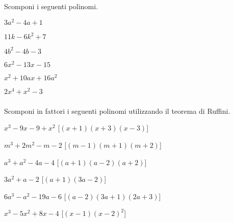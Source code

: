 \begin{esercizio}
 \label{ese:17.10}
 Scomponi i seguenti polinomi.
\begin{multicols}{3}
 \begin{enumeratea}
 \item $3a^{{2}}-4a+1$
 \item $11k-6k^{2}+7$
 \item $4b^{{2}}-4b-3$
 \item $6x^{2}-13x-15$
 \item $x^{2}+10ax+16a^{2}$
 \item $2x^{{4}}+x^{{2}}-3$
 \end{enumeratea}
\end{multicols}
 \end{esercizio}

\subsubsection*{}

\begin{esercizio}[\Ast]
\label{ese:17.13}
Scomponi in fattori i seguenti polinomi utilizzando il teorema di Ruffini.
 \begin{enumeratea}
 \item $x^{3}-9x-9+x^{2}$
  \hfill [$(x+1)(x+3)\left(x-3\right)$]
\item $m^{3}+2m^{2}-m-2$
  \hfill [$(m-1)(m+1)\left(m+2\right)$]
\item $a^{3}+a^{2}-4a-4$
  \hfill [$(a+1)(a-2)\left(a+2\right)$]
\item $3a^{2}+a-2$
  \hfill [$(a+1)\left(3a-2\right)$]
\item $6a^{3}-a^{2}-19a-6$
  \hfill [$(a-2)(3a+1)\left(2a+3\right)$]
\item $x^{3}-5x^{2}+8x-4$
  \hfill [$(x-1)(x-2)^{2}$]
 \end{enumeratea}
\end{esercizio}

